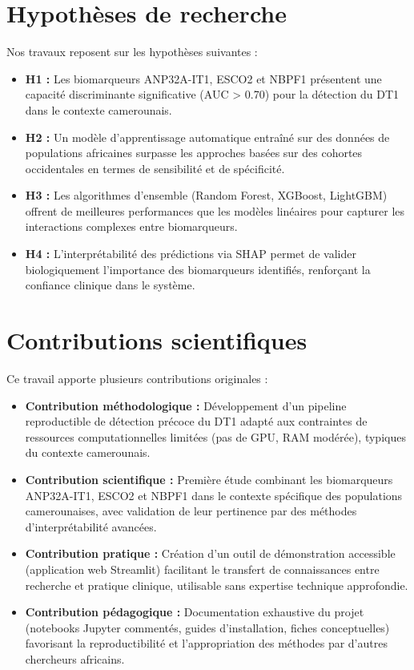 \section{Hypothèses de recherche}

Nos travaux reposent sur les hypothèses suivantes :

\begin{itemize}
    \item \textbf{H1 :} Les biomarqueurs ANP32A-IT1, ESCO2 et NBPF1 présentent une capacité discriminante significative (AUC > 0.70) pour la détection du DT1 dans le contexte camerounais.

    \item \textbf{H2 :} Un modèle d'apprentissage automatique entraîné sur des données de populations africaines surpasse les approches basées sur des cohortes occidentales en termes de sensibilité et de spécificité.

    \item \textbf{H3 :} Les algorithmes d'ensemble (Random Forest, XGBoost, LightGBM) offrent de meilleures performances que les modèles linéaires pour capturer les interactions complexes entre biomarqueurs.

    \item \textbf{H4 :} L'interprétabilité des prédictions via SHAP permet de valider biologiquement l'importance des biomarqueurs identifiés, renforçant la confiance clinique dans le système.
\end{itemize}

\section{Contributions scientifiques}

Ce travail apporte plusieurs contributions originales :

\begin{itemize}
    \item \textbf{Contribution méthodologique :} Développement d'un pipeline reproductible de détection précoce du DT1 adapté aux contraintes de ressources computationnelles limitées (pas de GPU, RAM modérée), typiques du contexte camerounais.

    \item \textbf{Contribution scientifique :} Première étude combinant les biomarqueurs ANP32A-IT1, ESCO2 et NBPF1 dans le contexte spécifique des populations camerounaises, avec validation de leur pertinence par des méthodes d'interprétabilité avancées.

    \item \textbf{Contribution pratique :} Création d'un outil de démonstration accessible (application web Streamlit) facilitant le transfert de connaissances entre recherche et pratique clinique, utilisable sans expertise technique approfondie.

    \item \textbf{Contribution pédagogique :} Documentation exhaustive du projet (notebooks Jupyter commentés, guides d'installation, fiches conceptuelles) favorisant la reproductibilité et l'appropriation des méthodes par d'autres chercheurs africains.
\end{itemize}

